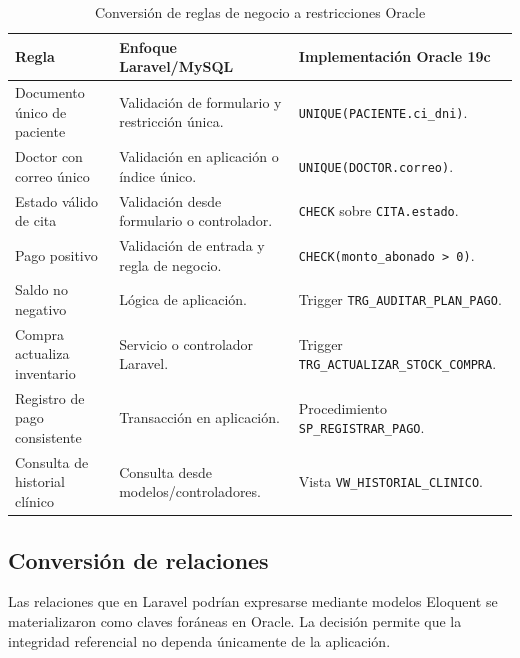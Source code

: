 \begin{table}[H]
\caption{Conversión de reglas de negocio a restricciones Oracle}
\centering
\small
\begin{tabularx}{\textwidth}{L{0.30\textwidth}Y Y}
\toprule
\textbf{Regla} & \textbf{Enfoque Laravel/MySQL} & \textbf{Implementación Oracle 19c} \\
\midrule
Documento único de paciente & Validación de formulario y restricción única. & \texttt{UNIQUE(PACIENTE.ci\_dni)}. \\
Doctor con correo único & Validación en aplicación o índice único. & \texttt{UNIQUE(DOCTOR.correo)}. \\
Estado válido de cita & Validación desde formulario o controlador. & \texttt{CHECK} sobre \texttt{CITA.estado}. \\
Pago positivo & Validación de entrada y regla de negocio. & \texttt{CHECK(monto\_abonado > 0)}. \\
Saldo no negativo & Lógica de aplicación. & Trigger \texttt{TRG\_AUDITAR\_PLAN\_PAGO}. \\
Compra actualiza inventario & Servicio o controlador Laravel. & Trigger \texttt{TRG\_ACTUALIZAR\_STOCK\_COMPRA}. \\
Registro de pago consistente & Transacción en aplicación. & Procedimiento \texttt{SP\_REGISTRAR\_PAGO}. \\
Consulta de historial clínico & Consulta desde modelos/controladores. & Vista \texttt{VW\_HISTORIAL\_CLINICO}. \\
\bottomrule
\end{tabularx}
\end{table}

\subsection{Conversión de relaciones}

Las relaciones que en Laravel podrían expresarse mediante modelos Eloquent se materializaron como claves foráneas en Oracle. La decisión permite que la integridad referencial no dependa únicamente de la aplicación.

